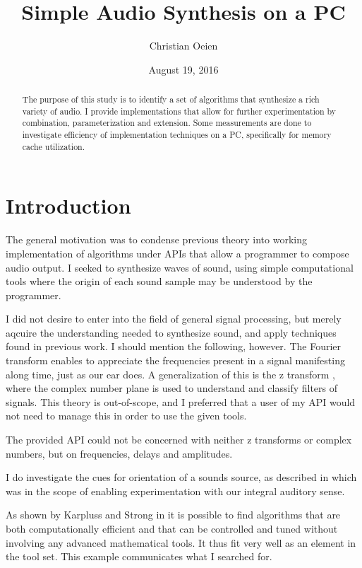 \documentclass{article}
\begin{document}
\title{Simple Audio Synthesis on a PC}
\author{Christian Oeien}
\date{August 19, 2016}
\maketitle

\begin{abstract}
The purpose of this study is to identify a set of algorithms that synthesize
a rich variety of audio.
I provide implementations that allow for further experimentation
by combination, parameterization and extension.
Some measurements are done to investigate efficiency
of implementation techniques
on a PC, specifically for memory cache utilization.
\end{abstract}

\section{Introduction}

The general motivation was to condense previous theory into working implementation
of algorithms under APIs that allow a programmer to compose audio output.
I seeked to synthesize waves of sound, using simple computational tools where
the origin of each sound sample may be understood by the programmer.

I did not desire to enter into the field of general signal processing,
but merely aqcuire the understanding needed to synthesize sound,
and apply techniques found in previous work.
I should mention the following, however.
The Fourier transform \cite{fourier}
enables to appreciate the frequencies present in a signal manifesting along
time, just as our ear does.
A generalization of this is the z transform \cite{polezero},
where the complex number plane
is used to understand and classify filters of signals.
This theory is out-of-scope, and I preferred that a user of my API would
not need to manage this in order to use the given tools.

The provided API could not be concerned with neither z transforms
or complex numbers, but on frequencies, delays and amplitudes.

I do investigate the cues for orientation of a sounds source,
as described in \cite{spatial} which was in the scope of enabling
experimentation with our integral auditory sense.

As shown by Karpluss and Strong in \cite{karplussstrong}
it is possible to find algorithms that are both computationally efficient
and that can be controlled and tuned without involving any advanced
mathematical tools.
It thus fit very well as an element in the tool set.
This example communicates what I searched for.
\end{document}
